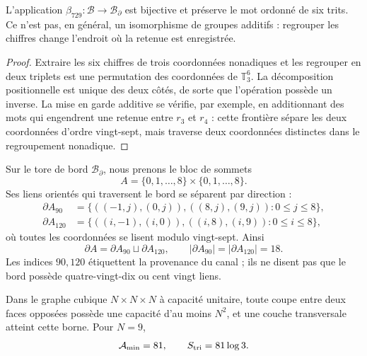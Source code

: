 \begin{proposition}
\label{prop:modular-beta729}
L'application \(\beta_{729}:\mathcal B\to\mathcal B_\partial\) est bijective et
préserve le mot ordonné de six trits. Ce n'est pas, en général, un
isomorphisme de groupes additifs : regrouper les chiffres change l'endroit où
la retenue est enregistrée.
\end{proposition}

\begin{proof}
Extraire les six chiffres de trois coordonnées nonadiques et les regrouper en
deux triplets est une permutation des coordonnées de \(\mathbb T_3^6\). La
décomposition positionnelle est unique des deux côtés, de sorte que
l'opération possède un inverse. La mise en garde additive se vérifie, par exemple,
en additionnant des mots qui engendrent une retenue entre \(r_3\) et \(r_4\) : cette
frontière sépare les deux coordonnées d'ordre vingt-sept, mais traverse
deux coordonnées distinctes dans le regroupement nonadique.
\end{proof}

Sur le tore de bord \(\mathcal B_\partial\), nous prenons le bloc de sommets
\begin{equation}
\label{eq:modular-block-A}
A=\{0,1,\ldots,8\}\times\{0,1,\ldots,8\}.
\end{equation}
Ses liens orientés qui traversent le bord se séparent par direction :
\begin{align}
\partial A_{90}
&=\{((-1,j),(0,j)),((8,j),(9,j)):0\leq j\leq8\},
\label{eq:modular-boundary90}\\
\partial A_{120}
&=\{((i,-1),(i,0)),((i,8),(i,9)):0\leq i\leq8\},
\label{eq:modular-boundary120}
\end{align}
où toutes les coordonnées se lisent modulo vingt-sept. Ainsi
\begin{equation}
\label{eq:modular-boundary-counts}
\partial A=\partial A_{90}\sqcup\partial A_{120},
\qquad
|\partial A_{90}|=|\partial A_{120}|=18.
\end{equation}
Les indices \(90,120\) étiquettent la provenance du canal ; ils ne disent pas que
le bord possède quatre-vingt-dix ou cent vingt liens.

\begin{theorem}
\label{thm:modular-triadic-cut}
Dans le graphe cubique \(N\times N\times N\) à capacité unitaire, toute
coupe entre deux faces opposées possède une capacité d'au moins \(N^2\), et une
couche transversale atteint cette borne. Pour \(N=9\),
\begin{equation}
\label{eq:modular-mincut-entropy}
\mathcal A_{\min}=81,
\qquad
S_{\rm tri}=81\log3.
\end{equation}
\end{theorem}

